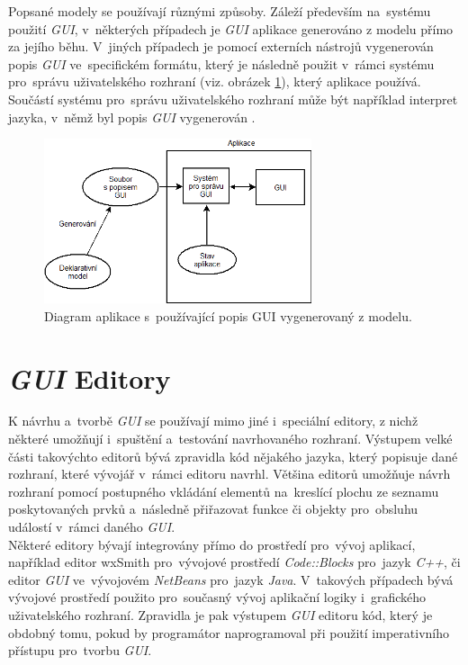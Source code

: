 \documentclass[11pt,twoside,a4paper]{book}
\begin{document}
Popsané modely se používají různými způsoby. Záleží především na~systému použití \textit{GUI}, v~některých případech je \textit{GUI} aplikace generováno z modelu přímo za jejího běhu. V~jiných případech je pomocí externích nástrojů vygenerován popis \textit{GUI} ve~specifickém formátu, který je následně použit v~rámci systému pro~správu uživatelského rozhraní (viz. obrázek \ref{fig:modelUse}), který aplikace používá. Součástí systému pro~správu uživatelského rozhraní může být například interpret jazyka, v~němž byl popis \textit{GUI} vygenerován \cite{bib:model}.\\

\begin{figure}[!ht]
\begin{center}
  \includegraphics[width=0.7\textwidth]{figures/modelUse}
\caption{{\label{fig:modelUse}}Diagram aplikace s~používající popis GUI vygenerovaný z modelu.}
\end{center}
\end{figure}

\section{\label{SEC:editGUI}\textit{GUI} Editory}
K návrhu a~tvorbě \textit{GUI} se používají mimo jiné i~speciální editory, z nichž některé umožňují i~spuštění a~testování navrhovaného rozhraní. Výstupem velké části takovýchto editorů bývá zpravidla kód nějakého jazyka, který popisuje dané rozhraní, které vývojář v~rámci editoru navrhl. Většina editorů umožňuje návrh rozhraní pomocí postupného vkládání elementů na~kreslící plochu ze seznamu poskytovaných prvků a~následně přiřazovat funkce či objekty pro~obsluhu událostí v~rámci daného \textit{GUI}.\\
Některé editory bývají integrovány přímo do prostředí pro~vývoj aplikací, například editor wxSmith pro~vývojové prostředí \textit{Code::Blocks} pro~jazyk \textit{C++}, či editor \textit{GUI} ve~vývojovém \textit{NetBeans} pro~jazyk \textit{Java}. V~takových případech bývá vývojové prostředí použito pro~současný vývoj aplikační logiky i~grafického uživatelského rozhraní. Zpravidla je pak výstupem \textit{GUI} editoru kód, který je obdobný tomu, pokud by programátor naprogramoval při použití imperativního přístupu pro~tvorbu \textit{GUI}.
\end{document}
